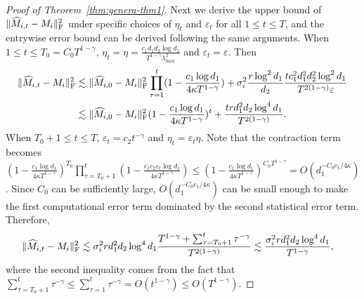 \documentclass[12pt]{article}
\newcommand\fro[1]{\| #1 \|_{\rm{F}}}
\theoremstyle{plain}
\begin{document}
\begin{proof}[Proof of Theorem~\ref{thm:genera-thm1}]
    Next we derive the upper bound of $\fro{\widehat{M}_{i,t}-M_i}^2$ under specific choices of $\eta_t$ and $\varepsilon_t$ for all $1\leq t\leq T$, and the entrywise error bound can be derived following the same arguments. When $1\leq t\leq T_0=C_0T^{1-\gamma}$, $\eta_t=\eta=\frac{c_1d_1d_2\log d_1}{T^{1-\gamma}\lambda_{\max}^2}$ and $\varepsilon_t=\varepsilon$. Then
    \begin{align*}
    \fro{\widehat{M}_{i,t}-M_i}^2&\lesssim \fro{\widehat{M}_{i,0}-M_i}^2\prod_{\tau=1}^{t} (1-\frac{c_1\log d_1}{4\kappa T^{1-\gamma}}) + \sigma_i^2\frac{r\log^2 d_1}{d_2}\frac{tc_1^2d_1^2d_2^2\log^2d_1}{T^{2(1-\gamma)}\varepsilon} \\
    &\lesssim \fro{\widehat{M}_{i,0}-M_i}^2(1-\frac{c_1\log d_1}{4\kappa T^{1-\gamma}})^t + \frac{trd_1^2d_2\log^4d_1}{T^{2(1-\gamma)}}.
    \end{align*}
    When $T_0+1\leq t\leq T$, $\varepsilon_t=c_2t^{-\gamma}$ and $\eta_t=\varepsilon_t\eta$. Note that the contraction term becomes $(1-\frac{c_1\log d_1}{4\kappa T^{1-\gamma}})^{T_0}\prod_{\tau=T_0+1}^{t} (1-\frac{c_1c_2\varepsilon_t\log d_1}{4\kappa T^{1-\gamma}})\leq (1-\frac{c_1\log d_1}{4\kappa T^{1-\gamma}})^{C_0T^{1-\gamma}}=O(d_1^{-C_0c_1/4\kappa})$. Since $C_0$ can be sufficiently large, $O(d_1^{-C_0c_1/4\kappa})$ can be small enough to make the first computational error term dominated by the second statistical error term. Therefore, 
    \begin{align}
    \fro{\widehat{M}_{i,t}-M_i}^2&\lesssim \sigma_i^2rd_1^2d_2\log^4d_1\frac{T^{1-\gamma}+\sum_{\tau=T_0+1}^{t} \tau^{-\gamma}}{T^{2(1-\gamma)}} \lesssim \frac{\sigma_i^2rd_1^2d_2\log^4d_1}{T^{1-\gamma}},
    \end{align}
    where the second inequality comes from the fact that $\sum_{\tau=T_0+1}^{t} \tau^{-\gamma}\leq \sum_{\tau=1}^{t} \tau^{-\gamma}=O(t^{1-\gamma})\leq O(T^{1-\gamma})$.
    \end{proof}
\end{document}
